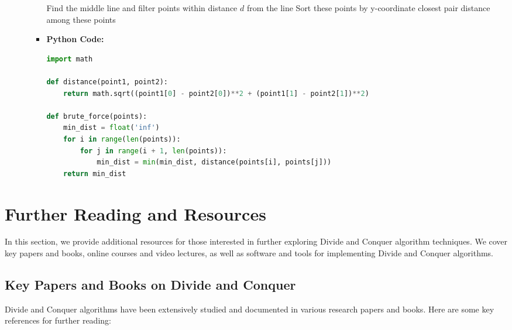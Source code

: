 \documentclass[12pt]{book} %
\begin{document}
\begin{itemize}
\begin{itemize}
\begin{itemize}
\begin{algorithm}[H]
\begin{algorithmic}[1]
            \State Find the middle line and filter points within distance $d$ from the line
            \State Sort these points by y-coordinate
            \State \Return closest pair distance among these points
        \EndProcedure
                \State {}
            \EndProcedure
            \end{algorithmic}
            \end{algorithm}
        \item \textbf{Python Code:}
        \begin{lstlisting}[language=Python]
import math

def distance(point1, point2):
    return math.sqrt((point1[0] - point2[0])**2 + (point1[1] - point2[1])**2)

def brute_force(points):
    min_dist = float('inf')
    for i in range(len(points)):
        for j in range(i + 1, len(points)):
            min_dist = min(min_dist, distance(points[i], points[j]))
    return min_dist
        \end{lstlisting}
        \end{itemize}
    \end{itemize}
\end{itemize}

\section{Further Reading and Resources}
In this section, we provide additional resources for those interested in further exploring Divide and Conquer algorithm techniques. We cover key papers and books, online courses and video lectures, as well as software and tools for implementing Divide and Conquer algorithms.

\subsection{Key Papers and Books on Divide and Conquer}
Divide and Conquer algorithms have been extensively studied and documented in various research papers and books. Here are some key references for further reading:
\end{document}
